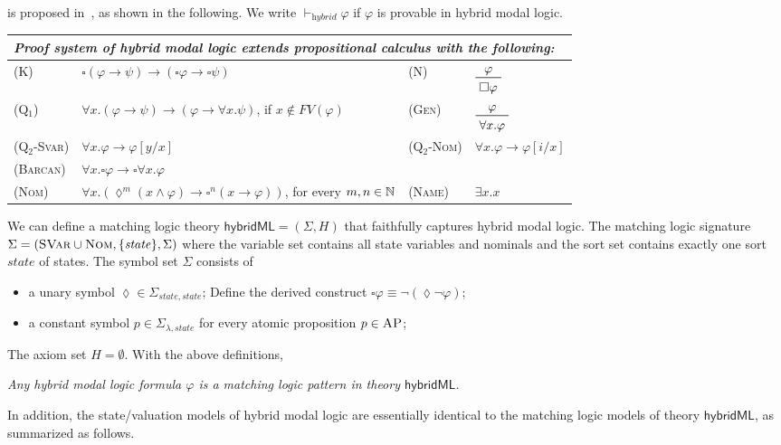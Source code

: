 \documentclass[letter,12pt]{article}
\newcommand{\imp}{\to}
\newcommand{\SVar}{\textnormal{\textsc{SVar}}}
\newcommand{\Nom}{\textnormal{\textsc{Nom}}}
\newcommand{\sig}{{\Sigma}}
\newcommand{\FV}{\mathit{FV}}
\newcommand{\MLhybridML}{\mathsf{hybridML}}
\newcommand{\hybridModalLogic}{\textit{hybrid}}
\newcommand{\prule}[1]{\textsc{(#1)}}
\newcommand{\AP}{\textsc{AP}}
\newcommand{\always}{{\square}}
\newcommand{\eventually}{{\lozenge}}
\newcommand{\statesort}{\mathit{state}}
\begin{document}
is proposed in~\cite{}, as shown in the following.
We write $\vdash_\hybridModalLogic \varphi$ if $\varphi$ is provable in hybrid modal logic.
\begin{center}
\renewcommand{\arraystretch}{1.15}
\begin{tabular}{lm{7cm}lm{3cm}}
\multicolumn{4}{l}{\em Proof system of hybrid modal logic extends
propositional calculus with the following:}
\\\hline
\prule{K}&
$\always (\varphi \imp \psi) \imp
 (\always \varphi \imp \always \psi)$
&
\prule{N}&
$\prftree{\varphi}{\always \varphi}$
\\
\prule{Q$_1$}&
$\forall x . (\varphi \imp \psi) \imp (\varphi \imp \forall x . \psi)$,
if $x \not\in \FV(\varphi)$
&
\prule{Gen} &
$\prftree{\varphi}{\forall x . \varphi}$
\\
\prule{Q$_2$-Svar} &
$\forall x . \varphi \imp \varphi[y/x]$
&
\prule{Q$_2$-Nom} &
$\forall x . \varphi \imp \varphi[i/x]$
\\
\prule{Barcan} &
$\forall x . \always \varphi \imp \always \forall x . \varphi$
\\
\prule{Nom}&
$\forall x . (\eventually^m (x \wedge \varphi)
\imp \always^n(x \imp \varphi))$,
for every $m,n \in \mathbb{N}$
&
\prule{Name}&
$\exists x . x$
\end{tabular}
\renewcommand{\arraystretch}{1}
\end{center}

We can define a matching logic theory 
$\MLhybridML = (\sig, H)$
that faithfully captures hybrid modal logic.
The matching logic signature $\sig = (\SVar \cup \Nom , \{ \statesort  \} , \Sigma)$
where the variable set contains all state variables and nominals
and the sort set contains exactly one sort $\statesort$ of states.
The symbol set $\Sigma$ consists of
\begin{itemize}
\item a unary symbol $\eventually \in \Sigma_{\statesort , \statesort}$;
      Define the derived construct
      $\always \varphi \equiv \neg (\eventually \neg \varphi)$;
\item a constant symbol $p \in \Sigma_{\lambda,\statesort}$ 
      for every atomic proposition $p \in \AP$;
\end{itemize}
The axiom set $H = \emptyset$.
With the above definitions,
\begin{center}
\em
Any hybrid modal logic formula $\varphi$ is a matching logic pattern
in theory $\MLhybridML$.
\end{center}
In addition, the state/valuation models of hybrid modal logic
are essentially identical to the matching logic models of theory $\MLhybridML$,
as summarized as follows.
\end{document}

